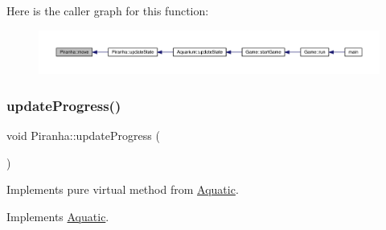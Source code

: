 Here is the caller graph for this function\+:\nopagebreak
\begin{figure}[H]
\begin{center}
\leavevmode
\includegraphics[width=350pt]{class_piranha_a6b86e73b3e5a57ee0fdb768c24ab9b67_icgraph}
\end{center}
\end{figure}
\mbox{\label{class_piranha_ac4906080867655ef09591eba1cf2f00c}} 
\subsubsection{\texorpdfstring{update\+Progress()}{updateProgress()}}
{\footnotesize\ttfamily void Piranha\+::update\+Progress (\begin{DoxyParamCaption}{ }\end{DoxyParamCaption})\hspace{0.3cm}{\ttfamily [virtual]}}



Implements pure virtual method from \mbox{\hyperlink{class_aquatic}{Aquatic}}. 



Implements \mbox{\hyperlink{class_aquatic_ae1b6301ed27d6aadb73c7ee7879c24af}{Aquatic}}.

